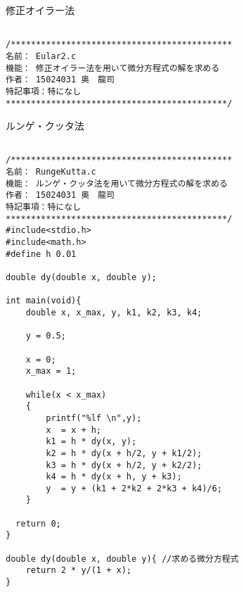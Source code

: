 \documentclass[a4j,titlepage]{jarticle}
\begin{document}
\begin{breakitembox}[l]{修正オイラー法} \small
\begin{verbatim}

/********************************************
名前： Eular2.c
機能： 修正オイラー法を用いて微分方程式の解を求める
作者： 15024031 奥　龍司
特記事項：特になし
********************************************/

\end{verbatim}
\end{breakitembox}


\begin{breakitembox}[l]{ルンゲ・クッタ法} \small
\begin{verbatim}

/********************************************
名前： RungeKutta.c
機能： ルンゲ・クッタ法を用いて微分方程式の解を求める
作者： 15024031 奥　龍司
特記事項：特になし
********************************************/
#include<stdio.h>
#include<math.h>
#define h 0.01

double dy(double x, double y);

int main(void){
    double x, x_max, y, k1, k2, k3, k4;
    
    y = 0.5;
    
    x = 0;
    x_max = 1;
    
    while(x < x_max)
    {
        printf("%lf \n",y);
        x  = x + h;
        k1 = h * dy(x, y);
        k2 = h * dy(x + h/2, y + k1/2);
        k3 = h * dy(x + h/2, y + k2/2);
        k4 = h * dy(x + h, y + k3);
        y  = y + (k1 + 2*k2 + 2*k3 + k4)/6;
    }
    
  return 0;
}

double dy(double x, double y){ //求める微分方程式
    return 2 * y/(1 + x);
}
\end{verbatim}
\end{breakitembox}
\end{document}
